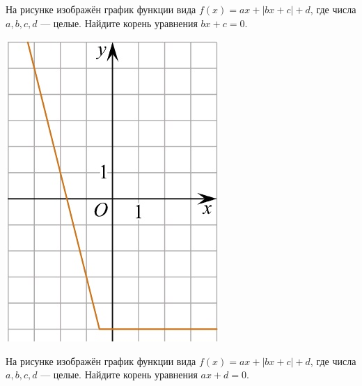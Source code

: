 \begin{class}[number=5]
\begin{listofex}
\begin{minipage}[c]{0.15\textwidth}
		\end{minipage}
		\item
		\begin{minipage}[t]{0.76\textwidth}
			На рисунке изображён график функции вида \(f(x)=ax+|bx+c|+d\), где числа \(a, b, c, d\) --- целые. Найдите корень уравнения \(bx+c=0\).
		\end{minipage}
		\begin{minipage}[c]{0.15\textwidth}
			\includegraphics[align=t, width=\textwidth]{pics/G111M4C5-5.jpg}
		\end{minipage}
		\item
		\begin{minipage}[t]{0.76\textwidth}
			На рисунке изображён график функции вида \(f(x)=ax+|bx+c|+d\), где числа \(a, b, c, d\) --- целые. Найдите корень уравнения \(ax+d=0\).
		\end{minipage}
		\begin{minipage}[c]{0.15\textwidth}

\end{minipage}
\end{listofex}
\end{class}
